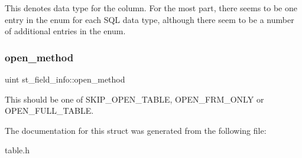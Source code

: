 This denotes data type for the column. For the most part, there seems to be one entry in the enum for each S\+QL data type, although there seem to be a number of additional entries in the enum. \mbox{\label{structst__field__info_a7e8e6e6d5634ec75f81a0540dc3ed7dd}} 
\subsubsection{\texorpdfstring{open\+\_\+method}{open\_method}}
{\footnotesize\ttfamily uint st\+\_\+field\+\_\+info\+::open\+\_\+method}

This should be one of {\ttfamily S\+K\+I\+P\+\_\+\+O\+P\+E\+N\+\_\+\+T\+A\+B\+LE}, {\ttfamily O\+P\+E\+N\+\_\+\+F\+R\+M\+\_\+\+O\+N\+LY} or {\ttfamily O\+P\+E\+N\+\_\+\+F\+U\+L\+L\+\_\+\+T\+A\+B\+LE}. 

The documentation for this struct was generated from the following file\+:\begin{DoxyCompactItemize}
\item 
table.\+h\end{DoxyCompactItemize}
